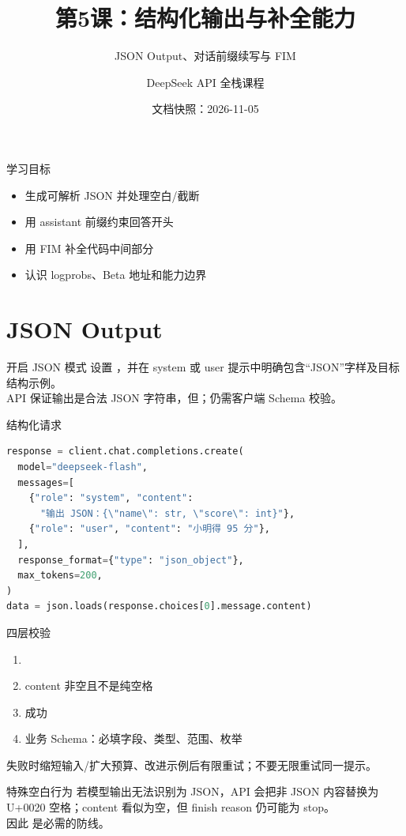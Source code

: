 \documentclass[aspectratio=169,UTF8]{ctexbeamer}
\title{第5课：结构化输出与补全能力}
\subtitle{JSON Output、对话前缀续写与 FIM}
\author{DeepSeek API 全栈课程}
\date{文档快照：2026-11-05}
\begin{document}
\frame{\titlepage}
\begin{frame}{学习目标}
\begin{itemize}
  \item 生成可解析 JSON 并处理空白/截断
  \item 用 assistant 前缀约束回答开头
  \item 用 FIM 补全代码中间部分
  \item 认识 logprobs、Beta 地址和能力边界
\end{itemize}
\end{frame}
\section{JSON Output}
\begin{frame}{开启 JSON 模式}
设置 ，并在 system 或 user 提示中明确包含“JSON”字样及目标结构示例。\\[8pt]
API 保证输出是合法 JSON 字符串，但；仍需客户端 Schema 校验。
\end{frame}
\begin{frame}[fragile]{结构化请求}
\begin{lstlisting}[language=Python]
response = client.chat.completions.create(
  model="deepseek-flash",
  messages=[
    {"role": "system", "content":
      "输出 JSON：{\"name\": str, \"score\": int}"},
    {"role": "user", "content": "小明得 95 分"},
  ],
  response_format={"type": "json_object"},
  max_tokens=200,
)
data = json.loads(response.choices[0].message.content)
\end{lstlisting}
\end{frame}
\begin{frame}{四层校验}
\begin{enumerate}
  \item {}
  \item content 非空且不是纯空格
  \item {} 成功
  \item 业务 Schema：必填字段、类型、范围、枚举
\end{enumerate}
失败时缩短输入/扩大预算、改进示例后有限重试；不要无限重试同一提示。
\end{frame}
\begin{frame}{特殊空白行为}
若模型输出无法识别为 JSON，API 会把非 JSON 内容替换为 U+0020 空格；content 看似为空，但 finish reason 仍可能为 stop。\\[8pt]
因此  是必需的防线。
\end{frame}
\end{document}
